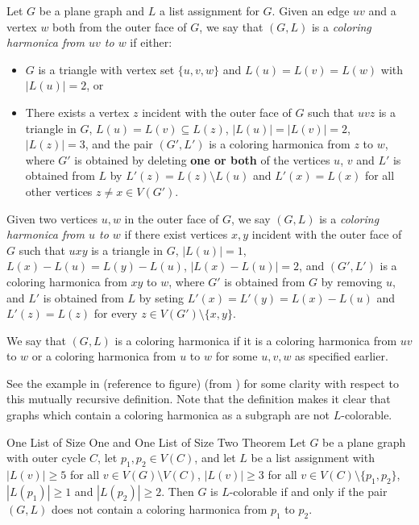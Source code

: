 \begin{definition}
Let $G$ be a plane graph and $L$ a list assignment for $G$. Given an edge $uv$ and a vertex $w$ both from the outer face of $G$, we say that $(G, L)$ is a \emph{coloring harmonica from $uv$ to $w$} if either:

	\begin{itemize}
		\item $G$ is a triangle with vertex set $\{u, v, w\}$ and $L(u) = L(v) = L(w)$ with $|L(u)| = 2$, or
		\item There exists a vertex $z$ incident with the outer face of $G$ such that $uvz$ is a triangle in $G$, $L(u) = L(v) \subseteq L(z)$, $|L(u)| = |L(v)| = 2$, $|L(z)| = 3$, and the pair $(G', L')$ is a coloring harmonica from $z$ to $w$, where $G'$ is obtained by deleting \textbf{one or both} of the vertices $u$, $v$ and $L'$ is obtained from $L$ by $L'(z) = L(z) \setminus L(u)$ and $L'(x) = L(x)$ for all other vertices $z \neq x \in V(G')$.
	\end{itemize}

	Given two vertices $u, w$ in the outer face of $G$, we say $(G, L)$ is a \emph{coloring harmonica from $u$ to $w$} if there exist vertices $x, y$ incident with the outer face of $G$ such that $uxy$ is a triangle in $G$, $|L(u)| = 1$, $L(x) - L(u) = L(y) - L(u)$, $|L(x)-L(u)|=2$, and $(G', L')$ is a coloring harmonica from $xy$ to $w$, where $G'$ is obtained from $G$ by removing $u$, and $L'$ is obtained from $L$ by seting $L'(x) = L'(y) = L(x)-L(u)$ and $L'(z) = L(z)$ for every $z \in V(G') \setminus \{x, y\}$.


We say that $(G, L)$ is a coloring harmonica if it is a coloring harmonica from $uv$ to $w$ or a coloring harmonica from $u$ to $w$ for some $u, v, w$ as specified earlier.
\end{definition}


See the example in (reference to figure) (from \cite{fivelistcoloring3}) for some clarity with respect to this mutually recursive definition. Note that the definition makes it clear that graphs which contain a coloring harmonica as a subgraph are not $L$-colorable. 

\begin{theorem}{One List of Size One and One List of Size Two Theorem \cite{fivelistcoloring3}}
Let $G$ be a plane graph with outer cycle $C$, let $p_1, p_2 \in V(C)$, and let
$L$ be a list assignment with $|L(v)| \geq 5$ for all $v \in V(G) \setminus V(C)$, $|L(v)| \geq 3$ for all
$v \in V (C) \setminus \{p_1 , p_2\}$, $|L(p_1)| \geq 1$ and $|L(p_2)| \geq 2$. Then $G$ is $L$-colorable if and only if the pair $(G, L)$ does not contain a coloring harmonica from $p_1$ to $p_2$.
\end{theorem}

